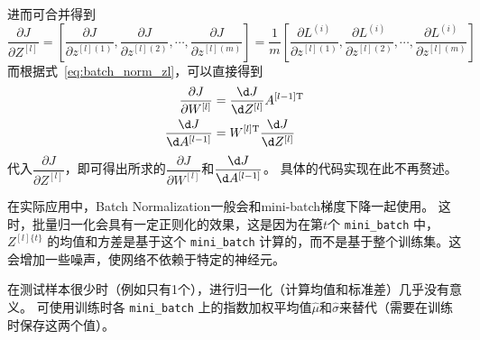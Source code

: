 进而可合并得到
\begin{equation}
    \dfrac{\partial J}{\partial Z^{[l]}} 
    = \left[ \dfrac{\partial J}{\partial z^{[l](1)}}, \dfrac{\partial J}{\partial z^{[l](2)}}, \cdots, \dfrac{\partial J}{\partial z^{[l](m)}} \right]
    = \dfrac{1}{m} \left[ \dfrac{\partial L^{(i)}}{\partial z^{[l](1)}}, \dfrac{\partial L^{(i)}}{\partial z^{[l](2)}}, \cdots, \dfrac{\partial L^{(i)}}{\partial z^{[l](m)}} \right]
\end{equation}
而根据式~\eqref{eq:batch_norm_zl}，可以直接得到
\begin{align}
    \dfrac{\partial J}{\partial W^{[l]}} &= \dfrac{\d J}{\d Z^{[l]}} A^{[l-1] \mathrm{T}} \\
    \dfrac{\d J}{\d A^{[l-1]}} &= W^{[l] \mathrm{T}} \dfrac{\d J}{\d Z^{[l]}}
\end{align}
代入$\dfrac{\partial J}{\partial Z^{[l]}}$，即可得出所求的$\dfrac{\partial J}{\partial W^{[l]}}$和$\dfrac{\d J}{\d A^{[l-1]}}$。
具体的代码实现在此不再赘述。

在实际应用中，Batch Normalization一般会和mini-batch梯度下降一起使用。
这时，批量归一化会具有一定正则化的效果，这是因为在第$t$个 \verb|mini_batch| 中，$Z^{[l]\{t\}}$ 的均值和方差是基于这个 \verb|mini_batch| 计算的，而不是基于整个训练集。这会增加一些噪声，使网络不依赖于特定的神经元。

在测试样本很少时（例如只有1个），进行归一化（计算均值和标准差）几乎没有意义。
可使用训练时各 \verb|mini_batch| 上的指数加权平均值$\hat{\mu}$和$\hat{\sigma}$来替代（需要在训练时保存这两个值）。
